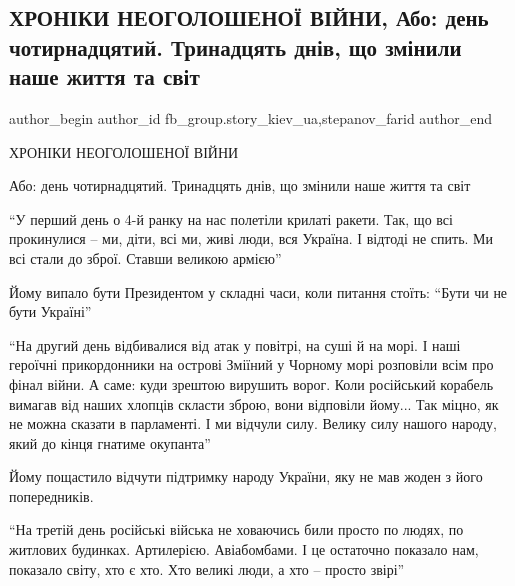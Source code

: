  
 
 
 
 
 
\subsection{ХРОНІКИ НЕОГОЛОШЕНОЇ ВІЙНИ, Або: день чотирнадцятий. Тринадцять днів, що змінили наше життя та світ}
\label{sec:10_03_2022.fb.fb_group.story_kiev_ua.1.hroniki}
 
\ifcmt
 author_begin
   author_id fb_group.story_kiev_ua,stepanov_farid
 author_end
\fi

ХРОНІКИ НЕОГОЛОШЕНОЇ ВІЙНИ

Або: день чотирнадцятий. Тринадцять днів, що змінили наше життя та світ

\enquote{У перший день о 4-й ранку на нас полетіли крилаті ракети. Так, що всі
прокинулися – ми, діти, всі ми, живі люди, вся Україна. І відтоді не спить. Ми
всі стали до зброї. Ставши великою армією}

Йому випало бути Президентом у складні часи, коли питання стоїть: \enquote{Бути чи не
бути Україні}


\enquote{На другий день відбивалися від атак у повітрі, на суші й на морі. І наші
героїчні прикордонники на острові Зміїний у Чорному морі розповіли всім про
фінал війни. А саме: куди зрештою вирушить ворог. Коли російський корабель
вимагав від наших хлопців скласти зброю, вони відповіли йому... Так міцно, як
не можна сказати в парламенті. І ми відчули силу. Велику силу нашого народу,
який до кінця гнатиме окупанта}

Йому пощастило відчути підтримку народу України, яку не мав жоден з його
попередників.

\enquote{На третій день російські війська не ховаючись били просто по людях, по
житлових будинках. Артилерією. Авіабомбами. І це остаточно показало нам,
показало світу, хто є хто. Хто великі люди, а хто – просто звірі}

